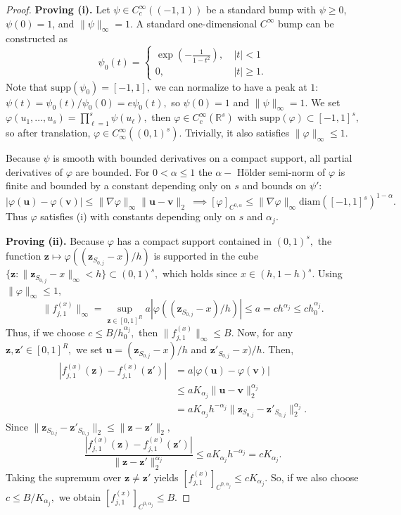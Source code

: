 \documentclass[10pt,a4paper]{amsart}
\newcommand{\bz}{\bm{z}}
\begin{document}
\begin{proof}
\textbf{Proving (i).} Let $\psi\in C^\infty_c((-1,1))$ be a standard bump with $\psi\ge 0$, $\psi(0)=1$, and $\|\psi\|_\infty=1$. A standard one-dimensional $C^{\infty}$ bump can be constructed as \[
\psi_0(t) = \begin{cases}
\exp \left(-\frac{1}{1-t^2} \right), & \ |t|<1 \\
0, & \ |t| \ge 1.
\end{cases}
\]
Note that $\textrm{supp}(\psi_0)=[-1,1],$ we can normalize to have a peak at $1$: $\psi(t) = \psi_0(t)/\psi_0(0) = e \psi_0(t),$ so $\psi(0)=1$ and $\|\psi\|_{\infty}=1.$ We set
\(
\varphi(u_1,\dots,u_s)=\prod_{\ell=1}^s \psi(u_\ell),
\)
then $\varphi \in C^{\infty} _c (\mathbb{R}^s)$ with $\textrm{supp}(\varphi) \subset [-1,1]^s,$ so after translation, $\varphi \in C^{\infty} _{\infty}((0,1)^s)$. Trivially, it also satisfies $\|\varphi\|_{\infty} \le 1.$

Because $\psi$ is smooth with bounded derivatives on a compact support, all partial derivatives of $\varphi$ are bounded. For $0<\alpha \le 1$ the $\alpha-$ H\"older semi-norm of $\varphi$ is finite and bounded by a constant depending only on $s$ and bounds on $\psi':$
\[
|\varphi(\bm{u})-\varphi(\bm{v})| \le \| \nabla \varphi \|_{\infty} \| \bm{u}-\bm{v} \|_{2} \ \implies [\varphi]_{C^{0,\alpha}} \le \|\nabla \varphi\|_{\infty} \text{diam}([-1,1]^s)^{1-\alpha}.
\]
Thus $\varphi$ satisfies (i) with constants depending only on $s$ and $\alpha_j$.

\textbf{Proving (ii).} Because $\varphi$ has a compact support contained in $(0,1)^s,$ the function $\bz \mapsto \varphi((\bz_{S_{0,j}}-x)/h)$ is supported in the cube $\{\bz : \|\bz_{S_{0,j}}-x\|_{\infty} < h\} \subset (0,1)^s,$ which holds since $x \in (h,1-h)^s.$ Using $\|\varphi\|_{\infty} \le 1,$
\[
\|f_{j,1}^{(x)}\|_{\infty} = \sup_{\bz \in [0,1]^R} a| \varphi((\bz_{S_{0,j}}-x)/h)| \le a = ch^{\alpha_j} \le ch_0 ^{\alpha_j}.
\]
Thus, if we choose $c \le B/h_0 ^{\alpha_j},$ then $\|f_{j,1} ^{(x)}\|_{\infty} \le B.$ Now, for any $\bz,\bz' \in [0,1]^R,$ we set $\bm{u}=(\bz_{S_{0,j}}-x)/h$ and $\bz'_{S_{0,j}}-x)/h.$ Then, 
\begin{align*}
    \left|f_{j,1}^{(x)}(\bz)-f_{j,1} ^{(x)}(\bz')\right| & = a | \varphi(\bm{u})-\varphi(\bm{v})| \\
    & \le a K_{\alpha_j} \|\bm{u}-\bm{v}\|_{2} ^{\alpha_j} \\
    & = a K_{\alpha_j} h^{-\alpha_j} \|\bz_{S_{0,j}} - \bz' _{S_{0,j}} \|_2 ^{\alpha_j}.
\end{align*}
Since $\|\bz_{S_{0.j}}-\bz'_{S_{0,j}}\|_2 \le \| \bz-\bz'\|_2,$ 
\[
\frac{\left| f_{j,1} ^{(x)} (\bz)-f_{j,1}^{(x)} (\bz') \right|}{\|\bz-\bz'\|_2 ^{\alpha_j}} \le a K_{\alpha_j} h^{-\alpha_j} = c K_{\alpha_j}.
\]
Taking the supremum over $\bz \neq \bz'$ yields $\left[f_{j,1} ^{(x)} \right]_{C^{0,\alpha_j}} \le c K_{\alpha_j}.$ So, if we also choose $c \le B/K_{\alpha_j},$ we obtain $\left[f_{j,1}^{(x)}\right]_{C^{0,\alpha_j}} \le B.$


\end{proof}
\end{document}
